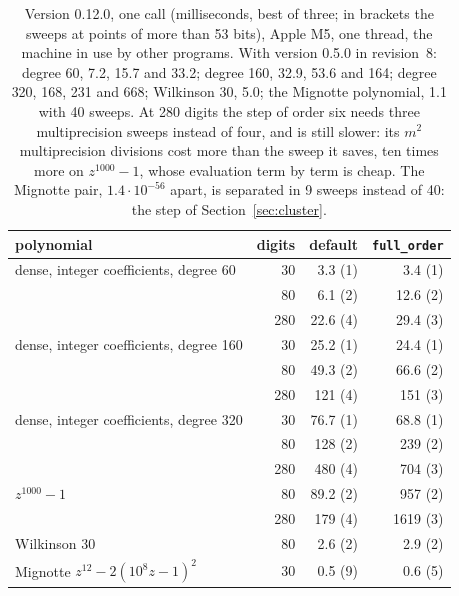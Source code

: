 \documentclass[10pt,a4paper]{article}
\theoremstyle{definition}
\numberwithin{equation}{section}
\begin{document}
\begin{table}[H]\centering\small
\begin{tabular}{lrrr}
\toprule
polynomial & digits & default & \texttt{full\_order}\\
\midrule
dense, integer coefficients, degree 60 & 30 & 3.3 (1) & 3.4 (1)\\
 & 80 & 6.1 (2) & 12.6 (2)\\
 & 280 & 22.6 (4) & 29.4 (3)\\
dense, integer coefficients, degree 160 & 30 & 25.2 (1) & 24.4 (1)\\
 & 80 & 49.3 (2) & 66.6 (2)\\
 & 280 & 121 (4) & 151 (3)\\
dense, integer coefficients, degree 320 & 30 & 76.7 (1) & 68.8 (1)\\
 & 80 & 128 (2) & 239 (2)\\
 & 280 & 480 (4) & 704 (3)\\
$z^{1000}-1$ & 80 & 89.2 (2) & 957 (2)\\
 & 280 & 179 (4) & 1619 (3)\\
Wilkinson 30 & 80 & 2.6 (2) & 2.9 (2)\\
Mignotte $z^{12}-2(10^8z-1)^2$ & 30 & 0.5 (9) & 0.6 (5)\\
\bottomrule
\end{tabular}
\caption{Version 0.12.0, one call (milliseconds, best of three; in brackets the sweeps at points of more
than 53 bits), Apple M5, one thread, the machine in use by other programs. With version 0.5.0 in
revision~8: degree 60, 7.2, 15.7 and 33.2; degree 160, 32.9, 53.6 and 164; degree 320, 168, 231 and 668;
Wilkinson 30, 5.0; the Mignotte polynomial, 1.1 with 40 sweeps. At 280 digits the step of order six needs
three multiprecision sweeps instead of four, and is still slower: its $m^2$ multiprecision divisions cost
more than the sweep it saves, ten times more on $z^{1000}-1$, whose evaluation term by term is cheap. The
Mignotte pair, $1.4\cdot10^{-56}$ apart, is separated in 9 sweeps instead of 40: the step of
Section~\ref{sec:cluster}.}\label{tab:precise}
\end{table}
\end{document}
